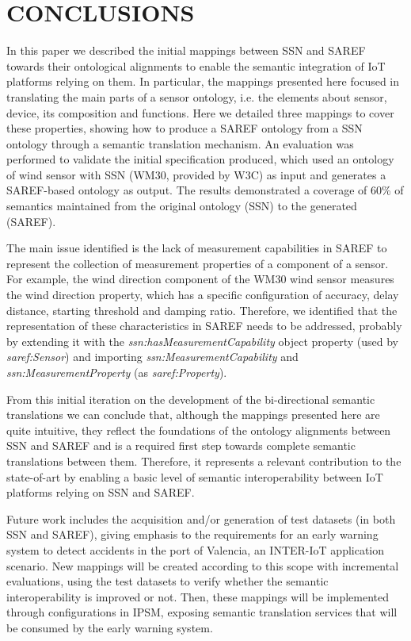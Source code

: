 \documentclass{sig-alternate-05-2015}
\begin{document}
\section{CONCLUSIONS}

In this paper we described the initial mappings between SSN and SAREF towards their ontological alignments to enable the semantic integration of IoT platforms relying on them. In particular, the mappings presented here focused in translating the main parts of a sensor ontology, i.e. the elements about sensor, device, its composition and functions. Here we detailed three mappings to cover these properties, showing how to produce a SAREF ontology from a SSN ontology through a semantic translation mechanism. An evaluation was performed to validate the initial specification produced, which used an ontology of wind sensor with SSN (WM30, provided by W3C) as input and generates a SAREF-based ontology as output. The results demonstrated a coverage of 60\% of semantics maintained from the original ontology (SSN) to the generated (SAREF). 

The main issue identified is the lack of measurement capabilities in SAREF to represent the collection of measurement properties of a component of a sensor. For example, the wind direction component of the WM30 wind sensor measures the wind direction property, which has a specific configuration of accuracy, delay distance, starting threshold and damping ratio. Therefore, we identified that the representation of these characteristics in SAREF needs to be addressed, probably by extending it with the \textit{ssn:\-has\-Measurement\-Capability} object property (used by \textit{saref:\-Sensor}) and importing \textit{ssn:\-Measurement\-Capability} and \textit{ssn:\-Measurement\-Property} (as \textit{saref:\-Property}).

From this initial iteration on the development of the bi-directional semantic translations we can conclude that, although the mappings presented here are quite intuitive, they reflect the foundations of the ontology alignments between SSN and SAREF and is a required first step towards complete semantic translations between them. Therefore, it represents a relevant contribution to the state-of-art by enabling a basic level of semantic interoperability between IoT platforms relying on SSN and SAREF. 

Future work includes the acquisition and/or generation of test datasets (in both SSN and SAREF), giving emphasis to the requirements for an early warning system \cite{Moreira2017} to detect accidents in the port of Valencia, an INTER-IoT application scenario. New mappings will be created according to this scope with incremental evaluations, using the test datasets to verify whether the semantic interoperability is improved or not. Then, these mappings will be implemented through configurations in IPSM, exposing semantic translation services that will be consumed by the early warning system. 
\end{document}
